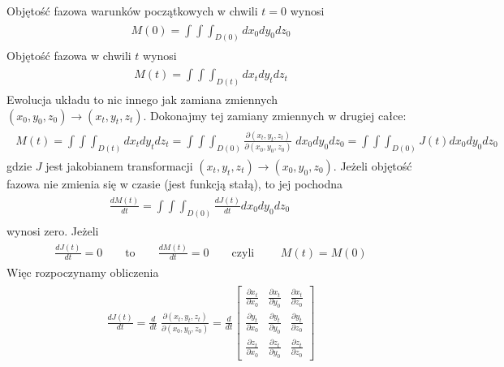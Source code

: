 \documentclass[a4paper,12pt,polish]{sphinxmanual}
\begin{document}
Objętość fazowa warunków początkowych w chwili $t=0$ wynosi
\label{ch1/chI022:equation-eqn23}\begin{gather}
\begin{split}M(0) = \int \int \int_{D(0)}  dx_0 dy_0 dz_0\end{split}\label{ch1/chI022-eqn23}
\end{gather}
Objętość fazowa w chwili $t$ wynosi
\label{ch1/chI022:equation-eqn24}\begin{gather}
\begin{split}M(t) = \int \int \int_{D(t)}  dx_t dy_t dz_t\end{split}\label{ch1/chI022-eqn24}
\end{gather}
Ewolucja układu to nic innego jak zamiana zmiennych $(x_0, y_0, z_0) \to (x_t, y_t, z_t)$. Dokonajmy tej zamiany zmiennych w drugiej całce:
\label{ch1/chI022:equation-eqn25}\begin{gather}
\begin{split}M(t) = \int \int \int_{D(t)}  dx_t dy_t dz_t   =  \int \int \int_{D(0)}  \frac{\partial (x_t, y_t, z_t)}{\partial (x_0, y_0, z_0)} \; dx_0 dy_0 dz_0  = \int \int \int_{D(0)}   J(t)  dx_0 dy_0 dz_0 \qquad\end{split}\label{ch1/chI022-eqn25}
\end{gather}
gdzie $J$ jest jakobianem transformacji  $(x_t, y_t, z_t) \to (x_0, y_0, z_0)$. Jeżeli objętość fazowa nie zmienia się w czasie (jest funkcją stałą), to jej pochodna
\label{ch1/chI022:equation-eqn26}\begin{gather}
\begin{split}\frac{dM(t)}{dt} = \int \int \int_{D(0)}  \frac{ dJ(t)}{dt}  dx_0 dy_0 dz_0  \qquad\end{split}\label{ch1/chI022-eqn26}
\end{gather}
wynosi zero. Jeżeli
\label{ch1/chI022:equation-eqn27}\begin{gather}
\begin{split} \frac{ dJ(t)}{dt} = 0  \qquad \mbox{to} \qquad \frac{dM(t)}{dt} = 0 \qquad \mbox{czyli } \qquad M(t)=M(0)\end{split}\label{ch1/chI022-eqn27}
\end{gather}
Więc rozpoczynamy obliczenia
\label{ch1/chI022:equation-eqn28}\begin{gather}
\begin{split} \frac{ dJ(t)}{dt} = \frac{d}{dt} \; \frac{\partial (x_t, y_t, z_t)}{\partial (x_0, y_0, z_0)} = \frac{d}{dt}  \begin{bmatrix}\frac{ \partial x_t}{\partial x_0}& \frac{\partial x_t}{\partial y_0}&\frac{ \partial x_t}{\partial z_0}\\ \frac{ \partial y_t}{\partial x_0}&  \frac{ \partial y_t}{\partial y_0} &\frac{ \partial y_t}{\partial z_0} \\ \frac{ \partial z_t}{\partial x_0}& \frac{ \partial z_t}{\partial y_0}&\frac{ \partial z_t}{\partial z_0} \end{bmatrix}\end{split}\label{ch1/chI022-eqn28}
\end{gather}
\end{document}
